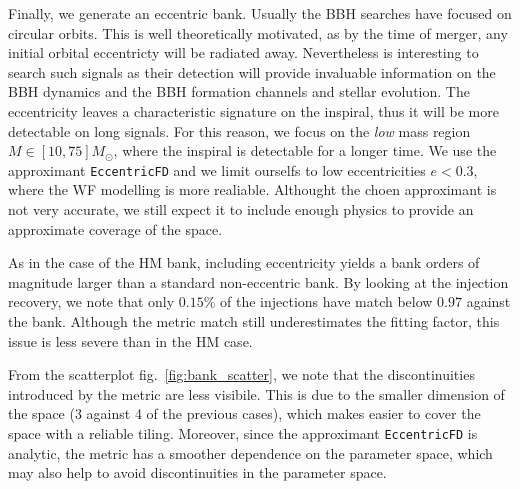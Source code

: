 \documentclass[twocolumn,showpacs,preprintnumbers,nofootinbib,prd,
superscriptaddress,10pt]{revtex4-1}
\begin{document}
Finally, we generate an eccentric bank. Usually the BBH searches have focused on circular orbits.
This is well theoretically motivated, as by the time of merger, any initial orbital eccentricty will be radiated away. Nevertheless is interesting to search such signals as their detection will provide invaluable information on the BBH dynamics and the BBH formation channels and stellar evolution.
The eccentricity leaves a characteristic signature on the inspiral, thus it will be more detectable on long signals. For this reason, we focus on the {\it low} mass region $M\in [10,75] M_\odot$, where the inspiral is detectable for a longer time.
We use the approximant \texttt{EccentricFD} and we limit ourselfs to low eccentricities $e<0.3$, where the WF modelling is more realiable. Althought the choen approximant is not very accurate, we still expect it to include enough physics to provide an approximate coverage of the space.

As in the case of the HM bank, including eccentricity yields a bank orders of magnitude larger than a standard non-eccentric bank.
By looking at the injection recovery, we note that only $0.15\%$ of the injections have match below $0.97$ against the bank. Although the metric match still underestimates the fitting factor, this issue is less severe than in the HM case.

From the scatterplot fig.~\ref{fig:bank_scatter}, we note that the discontinuities introduced by the metric are less visibile. This is due to the smaller dimension of the space (3 against 4 of the previous cases), which makes easier to cover the space with a reliable tiling. Moreover, since the approximant \texttt{EccentricFD} is analytic, the metric has a smoother dependence on the parameter space, which may also help to avoid discontinuities in the parameter space.
\end{document}
